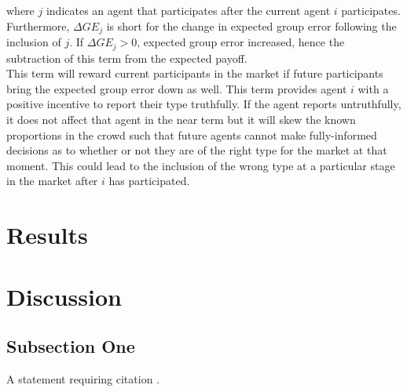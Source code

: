 \documentclass[twoside,twocolumn]{article}
\begin{document}
\\

\\
\newline

where $j$ indicates an agent that participates after the current agent $i$ participates. Furthermore, $\Delta GE_j$ is short for the change in expected group error following the inclusion of $j$. If $\Delta GE_j > 0$, expected group error increased, hence the subtraction of this term from the expected payoff.\\

This term will reward current participants in the market if future participants bring the expected group error down as well. This term provides agent $i$ with a positive incentive to report their type truthfully. If the agent reports untruthfully, it does not affect that agent in the near term but it will skew the known proportions in the crowd such that future agents cannot make fully-informed decisions as to whether or not they are of the right type for the market at that moment. This could lead to the inclusion of the wrong type at a particular stage in the market after $i$ has participated.









\section{Results}



\section{Discussion}

\subsection{Subsection One}

A statement requiring citation \cite{Figueredo:2009dg}.
\blindtext %
\end{document}
